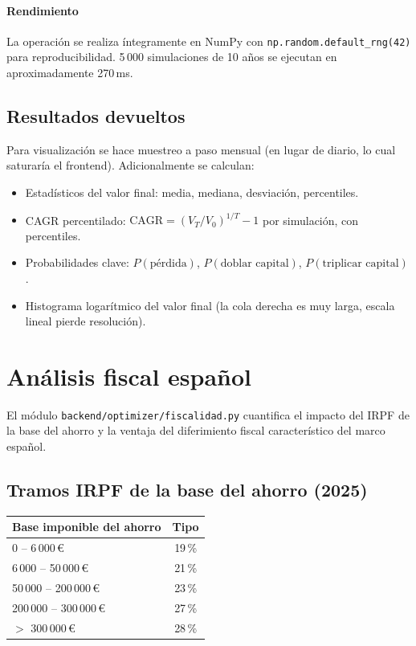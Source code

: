 \documentclass[11pt,a4paper]{article}
\begin{document}
\paragraph{Rendimiento}
La operación se realiza íntegramente en NumPy con \texttt{np.random.default\_rng(42)} para reproducibilidad. 5\,000 simulaciones de 10 años se ejecutan en aproximadamente 270\,ms.

\subsection{Resultados devueltos}

Para visualización se hace muestreo a paso mensual (en lugar de diario, lo cual saturaría el frontend). Adicionalmente se calculan:

\begin{itemize}
  \item Estadísticos del valor final: media, mediana, desviación, percentiles.
  \item CAGR percentilado: $\mathrm{CAGR} = (V_T/V_0)^{1/T} - 1$ por simulación, con percentiles.
  \item Probabilidades clave: $P(\text{pérdida})$, $P(\text{doblar capital})$, $P(\text{triplicar capital})$.
  \item Histograma logarítmico del valor final (la cola derecha es muy larga, escala lineal pierde resolución).
\end{itemize}

\section{Análisis fiscal español}

El módulo \texttt{backend/optimizer/fiscalidad.py} cuantifica el impacto del IRPF de la base del ahorro y la ventaja del diferimiento fiscal característico del marco español.

\subsection{Tramos IRPF de la base del ahorro (2025)}

\begin{center}
\begin{tabular}{l|c}
Base imponible del ahorro & Tipo \\\hline
0 -- 6\,000\,€         & 19\,\% \\
6\,000 -- 50\,000\,€   & 21\,\% \\
50\,000 -- 200\,000\,€ & 23\,\% \\
200\,000 -- 300\,000\,€ & 27\,\% \\
$>$ 300\,000\,€         & 28\,\% \\
\end{tabular}
\end{center}
\end{document}
